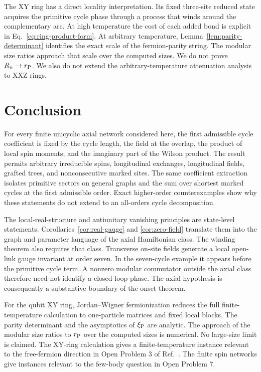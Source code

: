 \documentclass[aps,prb,preprint,nofootinbib,longbibliography]{revtex4-2}
\begin{document}
The XY ring has a direct locality interpretation.  Its fixed three-site
reduced state acquires the primitive cycle phase through a process that winds
around the complementary arc.  At high temperature the cost of each added
bond is explicit in Eq.~\eqref{eq:ring-product-form}.  At arbitrary
temperature, Lemma~\ref{lem:parity-determinant} identifies the exact scale of
the fermion-parity string.  The modular size ratios approach that scale over
the computed sizes.  We do not prove $R_n\to r_{\rm P}$.  We also do not extend
the arbitrary-temperature attenuation analysis to XXZ rings.

\section{Conclusion}
\label{sec:conclusion}

For every finite unicyclic axial network considered here, the first admissible
cycle coefficient is fixed by the cycle length, the field at the overlap, the
product of local spin moments, and the imaginary part of the Wilson product.
The result permits arbitrary irreducible spins, longitudinal exchanges,
longitudinal fields, grafted trees, and nonconsecutive marked sites.  The same
coefficient extraction isolates primitive sectors on general graphs and the
sum over shortest marked cycles at the first admissible order.  Exact
higher-order counterexamples show why these statements do not extend to an
all-orders cycle decomposition.

The local-real-structure and antiunitary vanishing principles are state-level
statements.  Corollaries~\ref{cor:real-gauge} and \ref{cor:zero-field}
translate them into the graph and parameter language of the axial
Hamiltonian class.  The winding theorem also requires that class.  Transverse
on-site fields generate a local open-link gauge invariant at order seven.  In
the seven-cycle example it
appears before the primitive cycle term.  A nonzero modular commutator outside
the axial class therefore need not identify a closed-loop phase.  The axial
hypothesis is consequently a substantive boundary of the onset theorem.

For the qubit XY ring, Jordan--Wigner fermionization reduces the full
finite-temperature calculation to one-particle matrices and fixed local
blocks.  The parity determinant and the asymptotics of $\xi_{\rm P}$ are
analytic.  The approach of the modular size ratios to $r_{\rm P}$ over the
computed sizes is numerical.  No large-size limit is claimed.  The XY-ring
calculation gives a finite-temperature instance relevant to the free-fermion
direction in Open Problem 3 of Ref.~\cite{KimEtAl2022PRB}.  The finite spin
networks give instances relevant to the few-body question in Open Problem 7.
\end{document}
